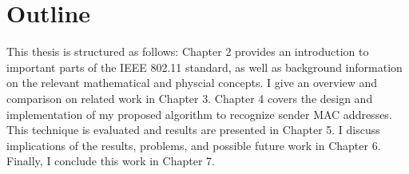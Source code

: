 
\section{Outline}

This thesis is structured as follows: Chapter 2 provides an introduction to important parts of the IEEE 802.11 standard, as well as background information on the relevant mathematical and physcial concepts. I give an overview and comparison on related work in Chapter 3. Chapter 4 covers the design and implementation of my proposed algorithm to recognize sender MAC addresses. This technique is evaluated and results are presented in Chapter 5. I discuss implications of the results, problems, and possible future work in Chapter 6. Finally, I conclude this work in Chapter 7.
